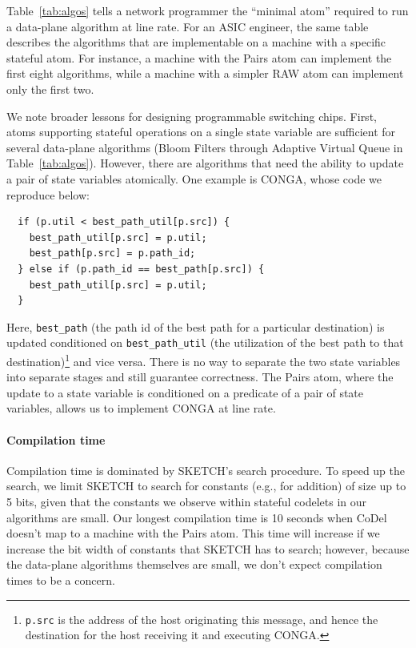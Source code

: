 Table~\ref{tab:algos} tells a network programmer the ``minimal atom'' required
to run a data-plane algorithm at line rate. For an ASIC engineer, the same
table describes the algorithms that are implementable on a \absmachine machine
with a specific stateful atom. For instance, a \absmachine machine with the
Pairs atom can implement the first eight algorithms, while a machine with a
simpler RAW atom can implement only the first two.

We note broader lessons for designing programmable switching chips.  First,
atoms supporting stateful operations on a single state variable are sufficient
for several data-plane algorithms (Bloom Filters through Adaptive Virtual Queue
in Table~\ref{tab:algos}). However, there are algorithms that need the ability
to update a pair of state variables atomically. One example is CONGA, whose
code we reproduce below:
\begin{verbatim}
  if (p.util < best_path_util[p.src]) {
    best_path_util[p.src] = p.util;
    best_path[p.src] = p.path_id;
  } else if (p.path_id == best_path[p.src]) {
    best_path_util[p.src] = p.util;
  }
\end{verbatim}
Here, \texttt{best\_path} (the path id of the best path for a particular
destination) is updated conditioned on \texttt{best\_path\_util} (the
utilization of the best path to that destination)\footnote{{\tt p.src} is the
  address of the host originating this message, and hence the destination for
the host receiving it and executing CONGA.} and vice versa. There is no way to
separate the two state variables into separate stages and still guarantee
correctness. The Pairs atom, where the update to a state variable is conditioned
on a predicate of a pair of state variables, allows us to implement CONGA at
line rate.

\paragraph{Compilation time}
Compilation time is dominated by SKETCH's search procedure.  To speed up the
search, we limit SKETCH to search for constants (e.g., for addition) of size up
to 5 bits, given that the constants we observe within stateful codelets in our
algorithms are small. Our longest compilation time is 10 seconds when CoDel
doesn't map to a \absmachine machine with the Pairs atom.  This time will
increase if we increase the bit width of constants that SKETCH has to search;
however, because the data-plane algorithms themselves are small, we don't
expect compilation times to be a concern.

